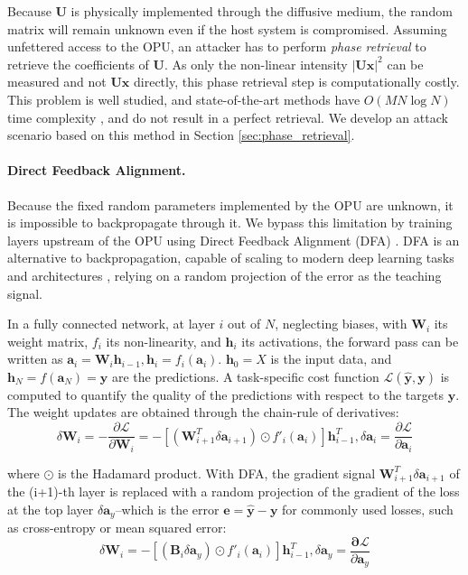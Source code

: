 \documentclass{article}
\begin{document}
Because $\mathbf{U}$ is physically implemented through the diffusive medium, the random matrix will remain unknown even if the host system is compromised. Assuming unfettered access to the OPU, an attacker has to perform \emph{phase retrieval} to retrieve the coefficients of $\mathbf{U}$. As only the non-linear intensity $\lvert\mathbf{Ux}\rvert^2$ can be measured and not $\mathbf{Ux}$ directly, this phase retrieval step is computationally costly. This problem is well studied, and state-of-the-art methods have $O(MN\log N)$ time complexity \cite{Gupta2020FastOS}, and do not result in a perfect retrieval. We develop an attack scenario based on this method in Section \ref{sec:phase_retrieval}.

\paragraph{Direct Feedback Alignment.} Because the fixed random parameters implemented by the OPU are unknown, it is impossible to backpropagate through it. We bypass this limitation by training layers upstream of the OPU using Direct Feedback Alignment (DFA) \cite{Nkland2016DirectFA}. DFA is an alternative to backpropagation, capable of scaling to modern deep learning tasks and architectures \cite{Launay2020DirectFA}, relying on a random projection of the error as the teaching signal.

In a fully connected network, at layer $i$ out of $N$, neglecting biases, with $\mathbf{W}_i$ its weight matrix, $f_i$ its non-linearity, and $\mathbf{h}_i$ its activations, the forward pass can be written as $\mathbf{a}_i = \mathbf{W}_i \mathbf{h}_{i - 1}, \mathbf{h}_i = f_i(\mathbf{a}_i)$.
$\mathbf{h}_0 = X$ is the input data, and $\mathbf{h}_N = f(\mathbf{a}_N) = \mathbf{\hat{y}}$ are the predictions.  A task-specific cost function $\mathcal{L}(\mathbf{\hat{y}}, \mathbf{y})$ is computed to quantify the quality of the predictions with respect to the targets $\mathbf{y}$. The weight updates are obtained through the chain-rule of derivatives: 
\begin{equation}
    \delta \mathbf{W}_i = - \frac{\partial \mathcal{L}}{\partial \mathbf{W}_i} = - [(\mathbf{W}_{i+1}^{T} \delta \mathbf{a}_{i+1})\odot f'_i(\mathbf{a}_i)] \mathbf{h}_{i-1}^{T}, \delta \mathbf{a}_i = \frac{\partial \mathcal{L}}{\partial \mathbf{a}_i}
\end{equation}

where $\odot$ is the Hadamard product. With DFA, the gradient signal $\mathbf{W}_{i+1}^{T}\delta \mathbf{a}_{i + 1}$ of the (i+1)-th layer is replaced with a random projection of the gradient of the loss at the top layer $\delta \mathbf{a}_y$--which is the error $\mathbf{e} = \mathbf{\hat{y}} - \mathbf{y}$ for commonly used losses, such as cross-entropy or mean squared error: 
\begin{equation}
    \delta \mathbf{W}_i = - [(\mathbf{B}_i\delta \mathbf{a}_y) \odot f'_i(\mathbf{a}_i)] \mathbf{h}_{i-1}^T, \delta \mathbf{a}_y = \frac{\mathbf{\partial \mathcal{L}}}{\partial \mathbf{a}_y}
\end{equation}
\end{document}
